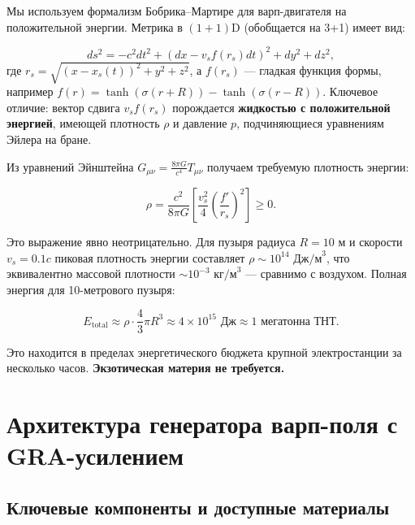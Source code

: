 \documentclass[11pt]{article}
\begin{document}
Мы используем формализм Бобрика--Мартире для варп-двигателя на положительной энергии. Метрика в $(1+1)$D (обобщается на 3+1) имеет вид:

\begin{equation}
ds^2 = -c^2 dt^2 + (dx - v_s f(r_s) dt)^2 + dy^2 + dz^2,
\label{eq:warp_metric}
\end{equation}
где $r_s = \sqrt{(x - x_s(t))^2 + y^2 + z^2}$, а $f(r_s)$ — гладкая функция формы, например $f(r) = \tanh(\sigma(r+R)) - \tanh(\sigma(r-R))$. Ключевое отличие: вектор сдвига $v_s f(r_s)$ порождается \textbf{жидкостью с положительной энергией}, имеющей плотность $\rho$ и давление $p$, подчиняющиеся уравнениям Эйлера на бране.

Из уравнений Эйнштейна $G_{\mu\nu} = \frac{8\pi G}{c^4} T_{\mu\nu}$ получаем требуемую плотность энергии:

\begin{equation}
\rho = \frac{c^2}{8\pi G} \left[ \frac{v_s^2}{4} \left( \frac{f'}{r_s} \right)^2 \right] \ge 0.
\label{eq:positive_energy_density}
\end{equation}

Это выражение явно неотрицательно. Для пузыря радиуса $R = 10$ м и скорости $v_s = 0.1c$ пиковая плотность энергии составляет $\rho \sim 10^{14} \text{ Дж/м}^3$, что эквивалентно массовой плотности $\sim 10^{-3} \text{ кг/м}^3$ — сравнимо с воздухом. Полная энергия для 10-метрового пузыря:

\begin{equation}
E_{\text{total}} \approx \rho \cdot \frac{4}{3}\pi R^3 \approx 4 \times 10^{15} \text{ Дж} \approx 1 \text{ мегатонна ТНТ}.
\label{eq:total_energy}
\end{equation}

Это находится в пределах энергетического бюджета крупной электростанции за несколько часов. \textbf{Экзотическая материя не требуется.}

\section{Архитектура генератора варп-поля с GRA-усилением}

\subsection{Ключевые компоненты и доступные материалы}
\end{document}
